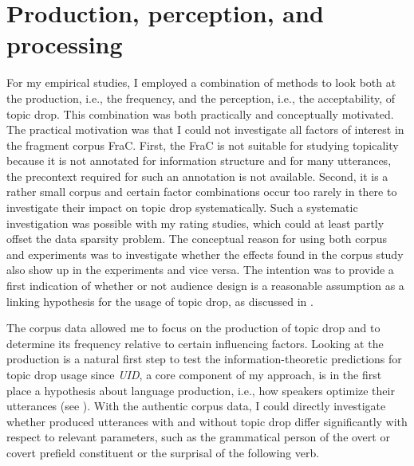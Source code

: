 \section{Production, perception, and processing}\label{sec:production.perception} 
For my empirical studies, I employed a combination of methods to look both at the production, i.e., the frequency, and the perception, i.e., the acceptability, of topic drop.
This combination was both practically and conceptually motivated.
The practical motivation was that I could not investigate all factors of interest in the fragment corpus FraC.
First, the FraC is not suitable for studying topicality because it is not annotated for information structure and for many utterances, the precontext required for such an annotation is not available.
Second, it is a rather small corpus and certain factor combinations occur too rarely in there to investigate their impact on topic drop systematically.
Such a systematic investigation was possible with my rating studies, which could at least partly offset the data sparsity problem.
The conceptual reason for using both corpus and experiments was to investigate whether the effects found in the corpus study also show up in the experiments and vice versa.
The intention was to provide a first indication of whether or not audience design  \citep{bell1984} is a reasonable assumption as a linking hypothesis for the usage of topic drop, as discussed in .

The corpus data allowed me to focus on the production of topic drop and to determine its frequency relative to certain influencing factors.
Looking at the production is a natural first step to test the information-theoretic predictions for topic drop usage since \textit{UID},  a core component of my approach, is in the first place a hypothesis about language production, i.e., how speakers optimize their utterances (see ).
With the authentic corpus data, I could directly investigate whether produced utterances with and without topic drop differ significantly with respect to relevant parameters, such as the grammatical person of the overt or covert prefield constituent or the surprisal of the following verb.

